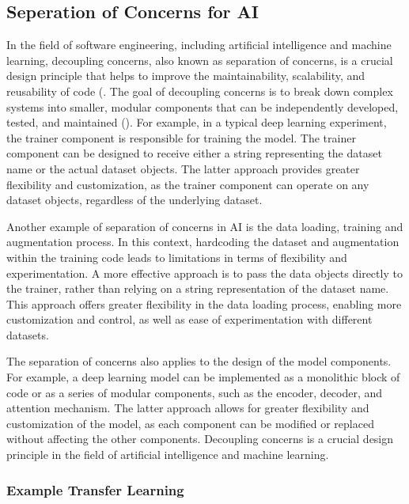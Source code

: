 \documentclass{article}
\begin{document}
\subsection{Seperation of Concerns for AI}

In the field of software engineering, including artificial intelligence and machine learning, decoupling concerns, also known as separation of concerns, is a crucial design principle that helps to improve the maintainability, scalability, and reusability of code (\cite{mo2016decoupling,qian2006decoupling, pressman2010software}. The goal of decoupling concerns is to break down complex systems into smaller, modular components that can be independently developed, tested, and maintained (\cite{pressman2010software, mo2016decoupling, qian2006decoupling}). For example, in a typical deep learning experiment, the trainer component is responsible for training the model. The trainer component can be designed to receive either a string representing the dataset name or the actual dataset objects. The latter approach provides greater flexibility and customization, as the trainer component can operate on any dataset objects, regardless of the underlying dataset.


Another example of separation of concerns in AI is the data loading, training and augmentation process. In this context, hardcoding the dataset and augmentation within the training code leads to limitations in terms of flexibility and experimentation. A more effective approach is to pass the data objects directly to the trainer, rather than relying on a string representation of the dataset name. This approach offers greater flexibility in the data loading process, enabling more customization and control, as well as ease of experimentation with different datasets.

The separation of concerns also applies to the design of the model components. For example, a deep learning model can be implemented as a monolithic block of code or as a series of modular components, such as the encoder, decoder, and attention mechanism. The latter approach allows for greater flexibility and customization of the model, as each component can be modified or replaced without affecting the other components. Decoupling concerns is a crucial design principle in the field of artificial intelligence and machine learning. 

\subsubsection{Example Transfer Learning}
\end{document}
